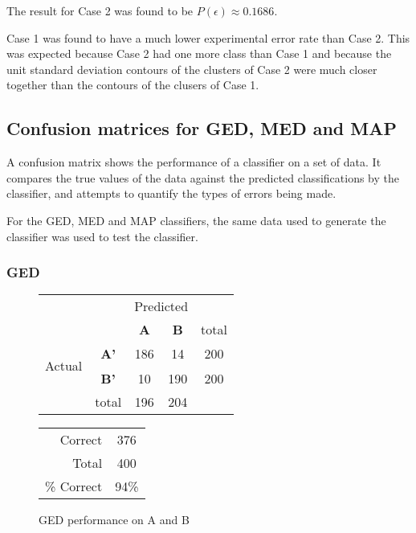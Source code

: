 The result for Case 2 was found to be $P(\epsilon)\approx0.1686$.

Case 1 was found to have a much lower experimental error rate than Case 2. This was expected because Case 2 had one more class than Case 1 and because the unit standard deviation contours of the clusters of Case 2 were much closer together than the contours of the clusers of Case 1.
 
\subsection{Confusion matrices for GED, MED and MAP}

A confusion matrix shows the performance of a classifier on a set of data. It compares the true values of the data against the predicted classifications by the classifier, and attempts to quantify the types of errors being made.

For the GED, MED and MAP classifiers, the same data used to generate the classifier was used to test the classifier.

\subsubsection{GED}
\begin{figure}[!ht]
\begin{minipage}[b]{0.5\linewidth}
\centering
	\begin{tabular}{ccc|c|c}
	 & &\multicolumn{2}{c}{Predicted} &\\
	  & & \bf{A} &  \bf{B} & total \\
	 \cline{3-5}
	 \multirow{2}{*}{\begin{sideways}Actual\end{sideways}} & \bf{A'}& 186 & 14 & 200 \\
	 \cline{3-5}
	 & \bf{B'}& 10 & 190 & 200 \\
	  \cline{3-5}
	 &total&196&204&\\
	\end{tabular}
\end{minipage}
\hspace{0.5cm}
\begin{minipage}[b]{0.5\linewidth}
	\begin{tabular}{r|c}
	\hline
	Correct& 376\\
	Total& 400\\
	\hline
	\% Correct& 94\%\\
	\hline
	\end{tabular}
\end{minipage}
\vspace{1mm}
\caption{GED performance on A and B}
\end{figure}

